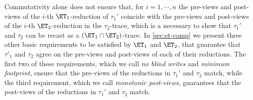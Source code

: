 Commutativity alone does not ensure that, for $i=1,\cdots,n$ the 
pre-views and post-views of the $i$-th $\ET_1$-reduction of $\tau_1'$ 
coincide with the pre-views and post-views of the $i$-th 
$\ET_2$-reduction in the $\tau_2$-trace, which is a necessary to show 
that $\tau_1'$ and $\tau_2$ can be recast as a $(\ET_1 \cap \ET_2)$-trace. 
In \cref{sec:et-comp} we present three other basic requirements to be 
satisfied by $\ET_1$ and $\ET_2$, that guarantee that $\tau'_1$ and 
$\tau_2$ agree on the pre-views and post-views of each of their reductions. 
The first two of these requirements, which we call 
\emph{no blind writes} and \emph{minimum footprint}, ensure that 
the pre-views of the reductions in $\tau_1'$ and $\tau_2$ match, 
while the third requirement, which we call \emph{monotonic post-views}, 
guarantees that the post-views of the reductions in $\tau_1'$ and $\tau_2$ 
match. 
%
%
%
%
